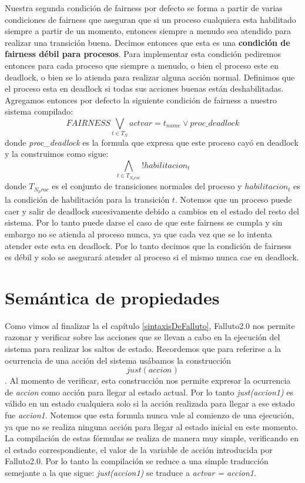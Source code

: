 \documentclass[titlepage, 12pt]{book}
\begin{document}
Nuestra segunda condici\'on de fairness por defecto se forma a partir de varias condiciones de fairness que aseguran que si un proceso cualquiera esta habilitado siempre a partir de un momento, entonces siempre a menudo sea atendido para realizar una transici\'on buena. Decimos entonces que esta es una \textbf{condici\'on de fairness d\'ebil para procesos}. Para implementar esta condici\'on pediremos entonces para cada proceso que siempre a menudo, o bien el proceso este en deadlock, o bien se lo atienda para realizar alguna acci\'on normal. Definimos que el proceso esta en deadlock si todas sus acciones buenas est\'an deshabilitadas. Agregamos entonces por defecto la siguiente condici\'on de fairness a nuestro sistema compilado:
$$FAIRNESS \bigvee_{t \in T_N} actvar = t_{name} \vee proc\_deadlock$$
donde \textit{proc\_deadlock} es la formula que expresa que este proceso cay\'o en deadlock y la construimos como sigue:
$$\bigwedge_{t \in T_{N_proc}}! habilitacion_{t}$$
donde $T_{N_proc}$ es el conjunto de transiciones normales del proceso y $habilitacion_{t}$ es la condici\'on de habilitaci\'on para la transici\'on $t$. Notemos que un proceso puede caer y salir de deadlock sucesivamente debido a cambios en el estado del resto del sistema. Por lo tanto puede darse el caso de que este fairness se cumpla y sin embargo no se atienda al proceso nunca, ya que cada vez que se lo intenta atender este esta en deadlock. Por lo tanto decimos que la condici\'on de fairness es d\'ebil y solo se asegurar\'a atender al proceso si el mismo nunca cae en deadlock.


\section{Sem\'antica de propiedades}
Como vimos al finalizar la el cap\'itulo \ref{sintaxisDeFalluto}, Falluto2.0 nos permite razonar y verificar sobre las acciones que se llevan a cabo en la ejecuci\'on del sistema para realizar los saltos de estado. Recordemos que para referirse a la ocurrencia de una acci\'on del sistema us\'abamos la construcci\'on $$just(accion)$$. Al momento de verificar, esta construcci\'on nos permite expresar la ocurrencia de \textit{accion} como acci\'on para llegar al estado actual. Por lo tanto \textit{just(accion1)} es v\'alido en un estado cualquiera solo si la acci\'on realizada para llegar a ese estado fue \textit{accion1}. Notemos que esta formula nunca vale al comienzo de una ejecuci\'on, ya que no se realiza ninguna acci\'on para llegar al estado inicial en este momento. La compilaci\'on de estas f\'ormulas se realiza de manera muy simple, verificando en el estado correspondiente, el valor de la variable de acci\'on introducida por Falluto2.0. Por lo tanto la compilaci\'on se reduce a una simple traducci\'on semejante a la que sigue: \textit{just(accion1)} se traduce a \textit{actvar = accion1}.\\
\end{document}
